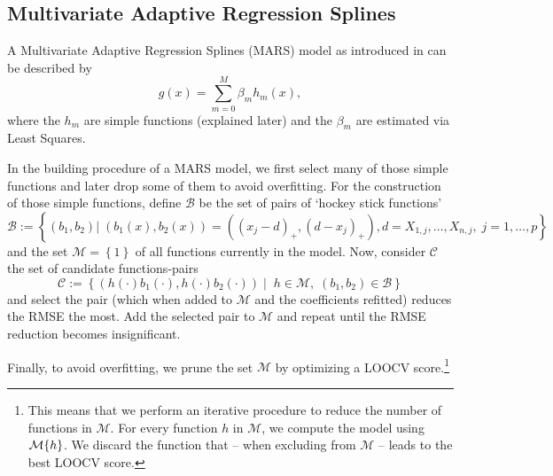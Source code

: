 \subsection{Multivariate Adaptive Regression Splines}{\label{sec:corr_model_MARS}
    A Multivariate Adaptive Regression Splines (MARS) model as introduced in \cite{friedmanMultivariateAdaptiveRegression1991} can be described by 
    \begin{equation}
        \label{eq:mars}
        g(x) = \sum_{m=0}^M \beta_m h_m(x),
    \end{equation}
    where the $h_m$ are simple functions (explained later) and the $\beta_m$ are estimated via Least Squares. 
    
    In the building procedure of a MARS model, we first select many of those simple functions and later drop some of them to avoid overfitting. For the construction of those simple functions, define $\mathcal{B}$ be the set of pairs of `hockey stick functions'
    \begin{equation}
        \label{eq:mars_basis_fun}
        \mathcal{B}:=\left\{
            \left(b_1,b_2\right) 
            | \;
            \left(b_1(x),b_2(x)\right) = \left(\left(x_{j}-d\right)_+,\left(d-x_{j}\right)_+\right),
            d =X_{1, j},  \ldots, X_{n, j},\;
            j=1, \ldots, p
        \right\}
    \end{equation}
    and the set $\mathcal{M}=\left\{1\right\}$ of all functions currently in the model. Now, consider $\mathcal{C}$ the set of candidate functions-pairs 
    \begin{equation}
        \label{eq:mars_candidate}
        \mathcal{C}:=\left\{
            \left(h(\cdot)b_1(\cdot),  h(\cdot)b_2(\cdot) \right)
            \;| \;\; h\in\mathcal{M}, \; 
            (b_1,b_2) \in \mathcal{B}
        \right\}
    \end{equation}
    and select the pair (which when added to $\mathcal{M}$ and the coefficients refitted) reduces the RMSE the most. Add the selected pair to $\mathcal{M}$ and repeat until the RMSE reduction becomes insignificant.

    Finally, to avoid overfitting, we prune the set $\mathcal{M}$ by optimizing a LOOCV score.\footnote{This means that we perform an iterative procedure to reduce the number of functions in $\mathcal{M}$. For every function $h$ in $\mathcal{M}$, we compute the model using $\mathcal{M}\\\{h\}$. We discard the function that -- when excluding from $\mathcal{M}$ -- leads to the best LOOCV score.}  

}
